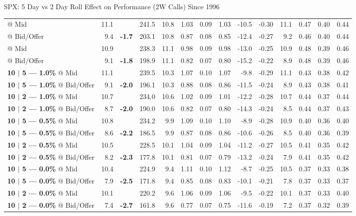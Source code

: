 \documentclass{beamer}
\begin{document}
\begin{frame}{\normalsize SPX: 5 Day vs 2 Day Roll Effect on Performance (2W Calls) Since 1996}
{\begin{tabular}{lrcrrrrrrrrrrr}
\color{blue}{\bf 10 $|$ 5 --- 1.5\%} @ Mid & 11.1 & & 241.5 & 10.8 & 1.03 & 0.09 & 1.03 & -10.5 & -0.30 & 11.1 & 0.47 & 0.40 & 0.44\\
\color{blue}{\bf 10 $|$ 5 --- 1.5\%} @ Bid/Offer & 9.4 & {\bf \color{red} -1.7} & 203.1 & 10.8 & 0.87 & 0.08 & 0.85 & -12.4 & -0.27 & 9.2 & 0.46 & 0.40 & 0.44\\
\addlinespace
\color{blue}{\bf 10 $|$ 2 --- 1.5\%} @ Mid & 10.9 & & 238.3 & 11.1 & 0.98 & 0.09 & 0.98 & -13.0 & -0.25 & 10.9 & 0.48 & 0.39 & 0.46\\
\color{blue}{\bf 10 $|$ 2 --- 1.5\%} @ Bid/Offer & 9.1 & {\bf \color{red}-1.8} & 198.9 & 11.1 & 0.82 & 0.07 & 0.80 & -15.2 & -0.22 & 8.9 & 0.48 & 0.39 & 0.46\\
\midrule

{\bf 10 $|$ 5 --- 1.0\%} @ Mid & 11.1 & & 239.5 & 10.3 & 1.07 & 0.10 & 1.07 & -9.8 & -0.29 & 11.1 & 0.43 & 0.38 & 0.42\\
{\bf 10 $|$ 5 --- 1.0\%} @ Bid/Offer & 9.1 & {\bf \color{red} -2.0} & 196.1 & 10.3 & 0.88 & 0.08 & 0.86 & -11.5 & -0.24 & 8.9 & 0.43 & 0.38 & 0.41\\
\addlinespace
{\bf 10 $|$ 2 --- 1.0\%} @ Mid & 10.7 & & 234.0 & 10.6 & 1.02 & 0.09 & 1.01 & -12.2 & -0.28 & 10.7 & 0.44 & 0.37 & 0.44\\
{\bf 10 $|$ 2 --- 1.0\%} @ Bid/Offer & 8.7 & {\bf \color{red}-2.0} & 190.0 & 10.6 & 0.82 & 0.07 & 0.80 & -14.3 & -0.24 & 8.5 & 0.44 & 0.37 & 0.43\\
\midrule

{\bf 10 $|$ 5 --- 0.5\%} @ Mid & 10.8 & & 234.2 & 9.9 & 1.09 & 0.10 & 1.10 & -8.9 & -0.28 & 10.9 & 0.40 & 0.36 & 0.40\\
{\bf 10 $|$ 5 --- 0.5\%} @ Bid/Offer & 8.6 & {\bf \color{red} -2.2} & 186.5 & 9.9 & 0.87 & 0.08 & 0.86 & -10.6 & -0.26 & 8.5 & 0.40 & 0.36 & 0.39\\
\addlinespace
{\bf 10 $|$ 2 --- 0.5\%} @ Mid & 10.5 & & 228.5 & 10.1 & 1.04 & 0.09 & 1.04 & -11.2 & -0.27 & 10.5 & 0.41 & 0.35 & 0.42\\
{\bf 10 $|$ 2 --- 0.5\%} @ Bid/Offer & 8.2 & {\bf \color{red}-2.3} & 177.8 & 10.1 & 0.81 & 0.07 & 0.79 & -13.2 & -0.24 & 7.9 & 0.41 & 0.35 & 0.42\\
\midrule

{\bf 10 $|$ 5 --- 0.0\%} @ Mid & 10.4 & & 224.9 & 9.4 & 1.11 & 0.10 & 1.12 & -8.7 & -0.25 & 10.5 & 0.37 & 0.33 & 0.38\\
{\bf 10 $|$ 5 --- 0.0\%} @ Bid/Offer & 7.9 & {\bf \color{red} -2.5} & 171.8 & 9.4 & 0.85 & 0.08 & 0.83 & -10.1 & -0.21 & 7.8 & 0.37 & 0.33 & 0.37\\
\addlinespace
{\bf 10 $|$ 2 --- 0.0\%} @ Mid & 10.1 & & 220.2 & 9.6 & 1.06 & 0.09 & 1.06 & -9.5 & -0.22 & 10.1 & 0.37 & 0.33 & 0.40\\
{\bf 10 $|$ 2 --- 0.0\%} @ Bid/Offer & 7.4 & {\bf \color{red}-2.7} & 161.8 & 9.6 & 0.77 & 0.07 & 0.75 & -11.6 & -0.19 & 7.2 & 0.37 & 0.32 & 0.39\\
\bottomrule
\bottomrule
\end{tabular}
}

\end{frame}
\end{document}

